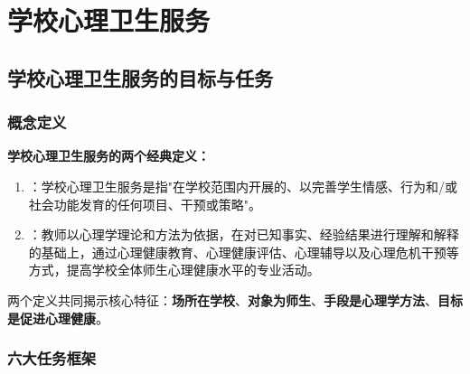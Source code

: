 \chapter{学校心理卫生服务}
\setcounter{chapter}{14}

\section{学校心理卫生服务的目标与任务}

\subsection{概念定义}

\begin{defbox}
\textbf{学校心理卫生服务的两个经典定义：}

\begin{enumerate}[leftmargin=*]
    \item {}：学校心理卫生服务是指"在学校范围内开展的、以完善学生情感、行为和/或社会功能发育的任何项目、干预或策略"。
    \item {}：教师以心理学理论和方法为依据，在对已知事实、经验结果进行理解和解释的基础上，通过心理健康教育、心理健康评估、心理辅导以及心理危机干预等方式，提高学校全体师生心理健康水平的专业活动。
\end{enumerate}

两个定义共同揭示核心特征：\textbf{场所在学校}、\textbf{对象为师生}、\textbf{手段是心理学方法}、\textbf{目标是促进心理健康}。
\end{defbox}

\subsection{六大任务框架}

